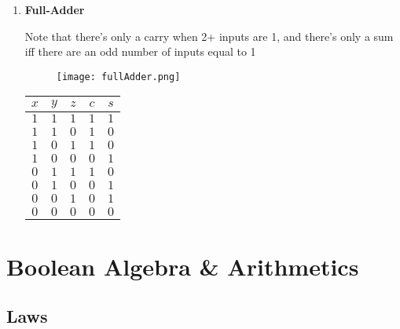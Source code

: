 \documentclass[english,course]{Notes}
\begin{document}
\begin{enumerate}
\begin{minipage}{\linewidth}
\end{minipage}

\item \textbf{Full-Adder}
	
	
	\par{Note that there's only a carry when 2+ inputs are 1, and there's only a sum iff there are an odd number of inputs equal to 1}
	
	\begin{minipage}{\linewidth}
      \centering
      \begin{minipage}{0.65\linewidth}
          \begin{figure}[ht]
              \texttt{[image: fullAdder.png]}
          \end{figure}
      \end{minipage}
      \hspace{0.05\linewidth}
      \begin{minipage}{0.25\linewidth}
      \begin{tabular}{|c|c|c|c|c|}
		$x$ & $y$ & $z$ & $c$ & $s$  \\
		\hline
		$1$ & $1$ & $1$ &  $1$ & $1$ \\
		$1$ & $1$ & $0$ &  $1$ & $0$ \\
		$1$ & $0$ & $1$ &  $1$ & $0$ \\
		$1$ & $0$ & $0$ &  $0$ & $1$ \\ 
		$0$ & $1$ & $1$ &  $1$ & $0$ \\ 
		$0$ & $1$ & $0$ &  $0$ & $1$ \\
		$0$ & $0$ & $1$ &  $0$ & $1$ \\ 
		$0$ & $0$ & $0$ &  $0$ & $0$ \\
	\end{tabular}
	\end{minipage}
	
\end{minipage}
\end{enumerate}

\section{Boolean Algebra \& Arithmetics}
\subsection{Laws}
\end{document}
